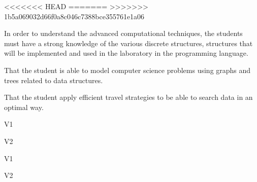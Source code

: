 \begin{syllabus}

<<<<<<< HEAD
=======
>>>>>>> 1b5a069032d66f0a8c046c7388bce355761e1a06

\begin{justification}
In order to understand the advanced computational techniques, the students must have a strong knowledge of the
various discrete structures, structures that will be implemented and used in the laboratory in the programming language.
\end{justification}

\begin{goals}
\item That the student is able to model computer science problems using graphs and trees related to data structures.
\item That the student apply efficient travel strategies to be able to search data in an optimal way.
\end{goals}

\begin{outcomes}{V1}
    \item {} 
    \item {} 
    \item {} 
    \item {} 
    \item {} 
\end{outcomes}

\begin{outcomes}{V2}
    \item {} 
    \item {} 
\end{outcomes}

\begin{competences}{V1}
    \item {}
    \item {}
    \item {}
    \item {}
    \item {}
    \item {}
\end{competences}

\begin{competences}{V2}
    \item {}
    \item {}
    \item {}
    \item {}
    \item {}
    \item {}
\end{competences}


\end{syllabus}
